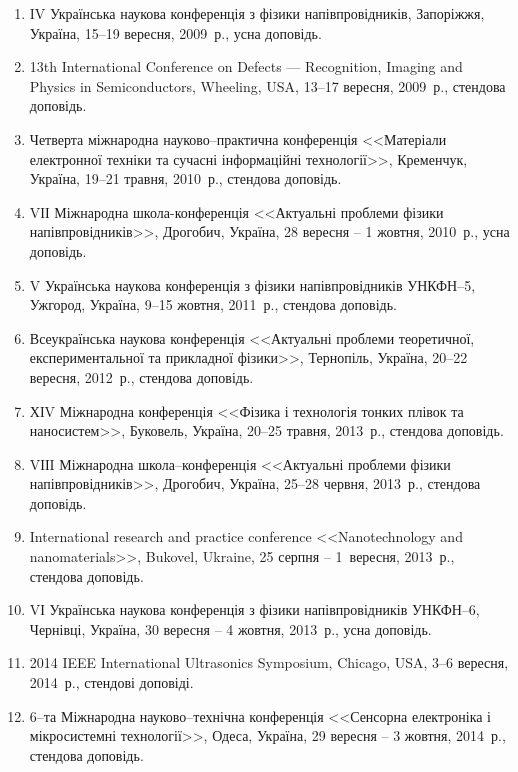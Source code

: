 \begin{enumerate}[label=\arabic*.,leftmargin=1em,itemindent=1em]
\item
IV Українська наукова конференція з фізики напівпровідників, Запоріжжя, Україна, 15--19 вересня, 2009~р., усна доповідь.

\item
13th International Conference on Defects --- Recognition, Imaging and Physics in Semiconductors, Wheeling, USA, 13--17 вересня, 2009~р., стендова доповідь.

\item
Четверта міжнародна науково--практична конференція <<Матеріали електронної техніки та сучасні інформаційні технології>>, Кременчук, Україна, 19--21 травня, 2010~р., стендова доповідь.

\item
VІІ Міжнародна школа-конференція <<Актуальні проблеми фізики напівпровідників>>, Дрогобич, Україна, 28 вересня -- 1 жовтня, 2010~р., усна доповідь.

\item
V Українська наукова конференція з фізики напівпровідників УНКФН--5, Ужгород, Україна, 9--15 жовтня, 2011~р., стендова доповідь.

\item
Всеукраїнська наукова конференція <<Актуальні проблеми теоретичної, експериментальної та прикладної фізики>>, Тернопіль, Україна, 20--22 вересня, 2012~р., стендова доповідь.

\item
ХІV Міжнародна конференція <<Фізика і технологія тонких плівок та наносистем>>, Буковель, Україна, 20--25 травня, 2013~р., стендова доповідь.

\item
VІІI Міжнародна школа--конференція <<Актуальні проблеми фізики напівпровідників>>, Дрогобич, Україна, 25--28 червня, 2013~р., стендова доповідь.

\item
International research and practice conference <<Nanotechnology and nanomaterials>>, Bukovel, Ukraine, 25 серпня -- 1~вересня, 2013~р., стендова доповідь.

\item
VІ Українська наукова конференція з фізики напівпровідників УНКФН--6, Чернівці, Україна, 30 вересня -- 4 жовтня, 2013~р., усна доповідь.

\item
2014 IEEE International Ultrasonics Symposium, Chicago, USA, 3--6 вересня, 2014~р., стендові доповіді.

\item
6--та Міжнародна науково--технічна конференція <<Сенсорна електроніка і мікросистемні технології>>, Одеса, Україна, 29 вересня -- 3 жовтня, 2014~р., стендова доповідь.


\end{enumerate}
